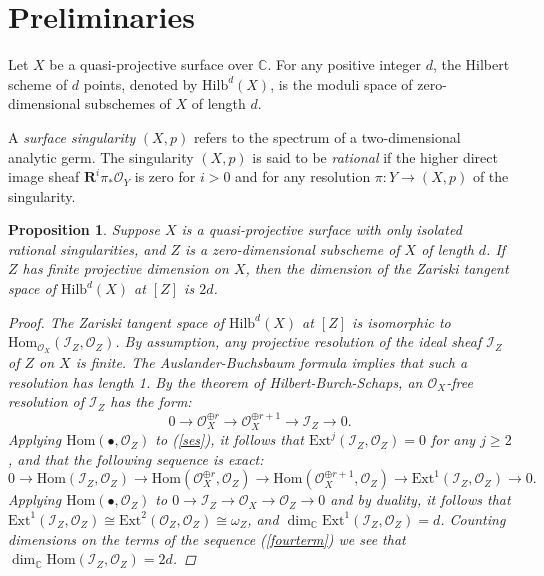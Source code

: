 \documentclass{amsart}[12pt]
\newtheorem{prop}[theorem]{Proposition}
\theoremstyle{definition}
\theoremstyle{remark}
\numberwithin{equation}{section}
\begin{document}
\section{Preliminaries}
Let $X$ be a quasi-projective surface over $\mathbb{C}$. For any positive integer $d$, the Hilbert scheme of $d$ points, denoted by $\mathrm{Hilb}^d(X)$, is the moduli space of zero-dimensional subschemes of $X$ of length $d$. 

A \textit{surface singularity} $(X, p)$ refers to the spectrum of a two-dimensional analytic germ. The singularity $(X, p)$ is said to be \textit{rational} if the higher direct image sheaf $\mathbf{R}^i\pi_*\mathcal{O}_Y$ is zero for $i > 0$ and for any resolution $\pi: Y \to (X, p)$ of the singularity.

\begin{prop}\label{smoothness}
Suppose $X$ is a quasi-projective surface with only isolated rational singularities, and $Z$ is a zero-dimensional subscheme of $X$ of length $d$. If $Z$ has finite projective dimension on $X$, then the dimension of the Zariski tangent space of $\mathrm{Hilb}^d(X)$ at $[Z]$ is $2d$.
\begin{proof}
The Zariski tangent space of $\mathrm{Hilb}^d(X)$ at $[Z]$ is isomorphic to $\mathrm{Hom}_{\mathcal{O}_X}(\mathcal{I}_Z, \mathcal{O}_Z)$. By assumption, any projective resolution of the ideal sheaf $\mathcal{I}_Z$ of $Z$ on $X$ is finite. The Auslander-Buchsbaum formula implies that such a resolution has length 1. By the theorem of Hilbert-Burch-Schaps, an $\mathcal{O}_X$-free resolution of $\mathcal{I}_Z$ has the form:
\begin{equation}\label{ses}
0 \to \mathcal{O}_X^{\oplus r} \to \mathcal{O}_X^{\oplus r + 1} \to \mathcal{I}_Z \to 0.
\end{equation}
Applying $\mathrm{Hom}(\bullet, \mathcal{O}_Z)$ to (\ref{ses}), it follows that $\mathrm{Ext}^j(\mathcal{I}_Z, \mathcal{O}_Z) = 0$ for any $j \geq 2$, and that the following sequence is exact:
\begin{equation}\label{fourterm}
0 \to \mathrm{Hom}(\mathcal{I}_Z, \mathcal{O}_Z) \to \mathrm{Hom}( \mathcal{O}_X^{\oplus r}, \mathcal{O}_Z) \to \mathrm{Hom}( \mathcal{O}_X^{\oplus r + 1}, \mathcal{O}_Z) \to  \mathrm{Ext}^1(\mathcal{I}_Z, \mathcal{O}_Z) \to 0.
\end{equation}
Applying $\mathrm{Hom}(\bullet, \mathcal{O}_Z)$ to $0 \to \mathcal{I}_Z \to \mathcal{O}_X \to \mathcal{O}_Z \to 0$ and by duality, it follows that $\mathrm{Ext}^1(\mathcal{I}_Z, \mathcal{O}_Z) \cong \mathrm{Ext}^2(\mathcal{O}_Z, \mathcal{O}_Z) \cong \omega_Z$, and $\dim_{\mathbb{C}} \mathrm{Ext}^1(\mathcal{I}_Z, \mathcal{O}_Z) = d$. Counting dimensions on the terms of the sequence (\ref{fourterm}) we see that $\dim_{\mathbb{C}} \mathrm{Hom}(\mathcal{I}_Z, \mathcal{O}_Z) = 2d$.
\end{proof}
\end{prop}
\end{document}
